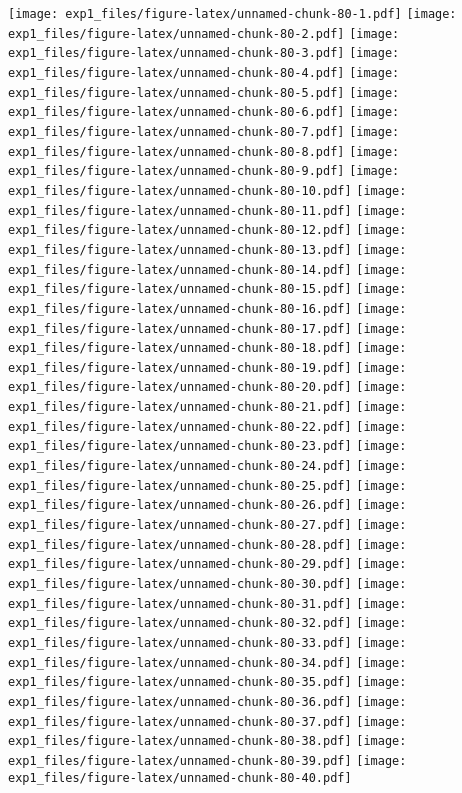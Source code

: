 \documentclass[11pt,,]{article}
\begin{document}
\texttt{[image: exp1\_files/figure-latex/unnamed-chunk-80-1.pdf]}
\texttt{[image: exp1\_files/figure-latex/unnamed-chunk-80-2.pdf]}
\texttt{[image: exp1\_files/figure-latex/unnamed-chunk-80-3.pdf]}
\texttt{[image: exp1\_files/figure-latex/unnamed-chunk-80-4.pdf]}
\texttt{[image: exp1\_files/figure-latex/unnamed-chunk-80-5.pdf]}
\texttt{[image: exp1\_files/figure-latex/unnamed-chunk-80-6.pdf]}
\texttt{[image: exp1\_files/figure-latex/unnamed-chunk-80-7.pdf]}
\texttt{[image: exp1\_files/figure-latex/unnamed-chunk-80-8.pdf]}
\texttt{[image: exp1\_files/figure-latex/unnamed-chunk-80-9.pdf]}
\texttt{[image: exp1\_files/figure-latex/unnamed-chunk-80-10.pdf]}
\texttt{[image: exp1\_files/figure-latex/unnamed-chunk-80-11.pdf]}
\texttt{[image: exp1\_files/figure-latex/unnamed-chunk-80-12.pdf]}
\texttt{[image: exp1\_files/figure-latex/unnamed-chunk-80-13.pdf]}
\texttt{[image: exp1\_files/figure-latex/unnamed-chunk-80-14.pdf]}
\texttt{[image: exp1\_files/figure-latex/unnamed-chunk-80-15.pdf]}
\texttt{[image: exp1\_files/figure-latex/unnamed-chunk-80-16.pdf]}
\texttt{[image: exp1\_files/figure-latex/unnamed-chunk-80-17.pdf]}
\texttt{[image: exp1\_files/figure-latex/unnamed-chunk-80-18.pdf]}
\texttt{[image: exp1\_files/figure-latex/unnamed-chunk-80-19.pdf]}
\texttt{[image: exp1\_files/figure-latex/unnamed-chunk-80-20.pdf]}
\texttt{[image: exp1\_files/figure-latex/unnamed-chunk-80-21.pdf]}
\texttt{[image: exp1\_files/figure-latex/unnamed-chunk-80-22.pdf]}
\texttt{[image: exp1\_files/figure-latex/unnamed-chunk-80-23.pdf]}
\texttt{[image: exp1\_files/figure-latex/unnamed-chunk-80-24.pdf]}
\texttt{[image: exp1\_files/figure-latex/unnamed-chunk-80-25.pdf]}
\texttt{[image: exp1\_files/figure-latex/unnamed-chunk-80-26.pdf]}
\texttt{[image: exp1\_files/figure-latex/unnamed-chunk-80-27.pdf]}
\texttt{[image: exp1\_files/figure-latex/unnamed-chunk-80-28.pdf]}
\texttt{[image: exp1\_files/figure-latex/unnamed-chunk-80-29.pdf]}
\texttt{[image: exp1\_files/figure-latex/unnamed-chunk-80-30.pdf]}
\texttt{[image: exp1\_files/figure-latex/unnamed-chunk-80-31.pdf]}
\texttt{[image: exp1\_files/figure-latex/unnamed-chunk-80-32.pdf]}
\texttt{[image: exp1\_files/figure-latex/unnamed-chunk-80-33.pdf]}
\texttt{[image: exp1\_files/figure-latex/unnamed-chunk-80-34.pdf]}
\texttt{[image: exp1\_files/figure-latex/unnamed-chunk-80-35.pdf]}
\texttt{[image: exp1\_files/figure-latex/unnamed-chunk-80-36.pdf]}
\texttt{[image: exp1\_files/figure-latex/unnamed-chunk-80-37.pdf]}
\texttt{[image: exp1\_files/figure-latex/unnamed-chunk-80-38.pdf]}
\texttt{[image: exp1\_files/figure-latex/unnamed-chunk-80-39.pdf]}
\texttt{[image: exp1\_files/figure-latex/unnamed-chunk-80-40.pdf]}
\end{document}
